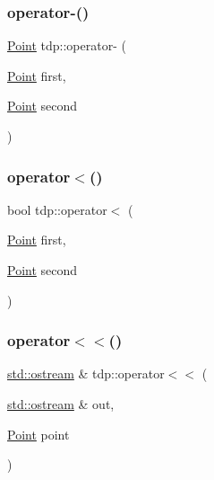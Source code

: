 \subsubsection{\texorpdfstring{operator-\/()}{operator-()}}
{\footnotesize\ttfamily \mbox{\hyperlink{structtdp_1_1_point}{Point}} tdp\+::operator-\/ (\begin{DoxyParamCaption}\item[{\mbox{\hyperlink{structtdp_1_1_point}{Point}}}]{first,  }\item[{\mbox{\hyperlink{structtdp_1_1_point}{Point}}}]{second }\end{DoxyParamCaption})}

\mbox{\label{namespacetdp_aa76700935906dbb491a443a4662d758f}} 
\subsubsection{\texorpdfstring{operator$<$()}{operator<()}}
{\footnotesize\ttfamily bool tdp\+::operator$<$ (\begin{DoxyParamCaption}\item[{\mbox{\hyperlink{structtdp_1_1_point}{Point}}}]{first,  }\item[{\mbox{\hyperlink{structtdp_1_1_point}{Point}}}]{second }\end{DoxyParamCaption})}

\mbox{\label{namespacetdp_a40a6deb04f2cc708b0cd33955e23ffb6}} 
\subsubsection{\texorpdfstring{operator$<$$<$()}{operator<<()}}
{\footnotesize\ttfamily \mbox{\hyperlink{doctest_8h_a116af65cb5e924b33ad9d9ecd7a783f3}{std\+::ostream}} \& tdp\+::operator$<$$<$ (\begin{DoxyParamCaption}\item[{\mbox{\hyperlink{doctest_8h_a116af65cb5e924b33ad9d9ecd7a783f3}{std\+::ostream}} \&}]{out,  }\item[{\mbox{\hyperlink{structtdp_1_1_point}{Point}}}]{point }\end{DoxyParamCaption})}

\mbox{\label{namespacetdp_a3d677102635fab3ad0088b88378e5b48}} 
